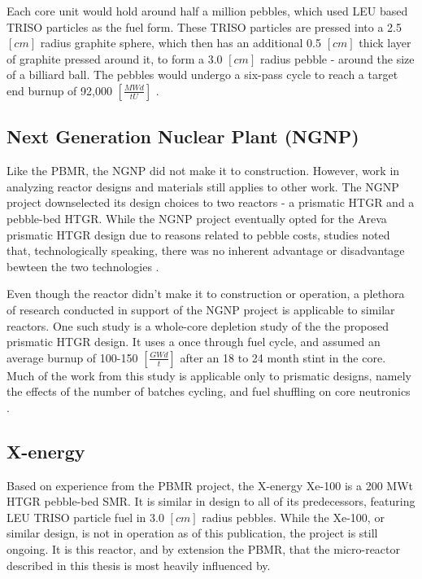 

Each core unit would hold around half a million pebbles, which used LEU based TRISO particles as the fuel form.  These TRISO particles are pressed into a 2.5 $\left[cm\right]$ radius graphite sphere, which then has an additional 0.5 $\left[cm\right]$ thick layer of graphite pressed around it, to form a 3.0 $\left[cm\right]$ radius pebble - around the size of a billiard ball.  The pebbles would undergo a six-pass cycle to reach a target end burnup of 92,000 $\left[\frac{MWd}{tU}\right]$ \cite{venter_pbmr_2005}. 

\subsection{Next Generation Nuclear Plant (NGNP)}

Like the PBMR, the NGNP did not make it to construction.  However, work in analyzing reactor designs and materials still applies to other work.  The NGNP project downselected its design choices to two reactors - a prismatic HTGR and a pebble-bed HTGR.  While the NGNP project eventually opted for the Areva prismatic HTGR design \cite{noauthor_areva_nodate} due to reasons related to pebble costs, studies noted that, technologically speaking, there was no inherent advantage or disadvantage bewteen the two technologies \cite{inl_basis_2011}.

Even though the reactor didn't make it to construction or operation, a plethora of research conducted in support of the NGNP project is applicable to similar reactors.  One such study is a whole-core depletion study of the the proposed prismatic HTGR design.  It uses a once through fuel cycle, and assumed an average burnup of 100-150 $\left[\frac{GWd}{t}\right]$ after an 18 to 24 month stint in the core.  Much of the work from this study is applicable only to prismatic designs, namely the effects of the number of batches cycling, and fuel shuffling on core neutronics \cite{tkkim_whole-core_nodate}.

\subsection{X-energy}

Based on experience from the PBMR project, the X-energy Xe-100 is a 200 MWt HTGR pebble-bed SMR.  It is similar in design to all of its predecessors, featuring LEU TRISO particle fuel in 3.0 $\left[cm\right]$ radius pebbles.  While the Xe-100, or similar design, is not in operation as of this publication, the project is still ongoing.  It is this reactor, and by extension the PBMR, that the micro-reactor described in this thesis is most heavily influenced by.

